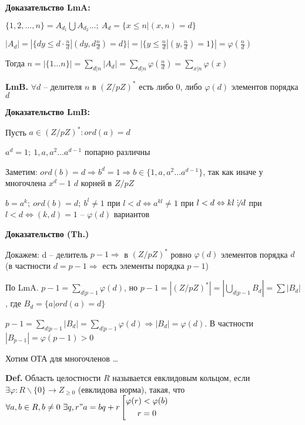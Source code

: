 \documentclass[14pt, letter paper]{article}
\def\divby{%
  \mathrel{\text{\vbox{\baselineskip.65ex\lineskiplimit0pt\hbox{.}\hbox{.}\hbox{.}}}}%
}
\begin{document}
\textbf{Доказательство LmA:}

$\{ 1, 2, \ldots, n\} = A_{d_1} \bigcup A_{d_2} \ldots;\ A_d = \{ x \leq n | (x, n) = d \}$

$|A_d| = |\{ dy \leq d \cdot \frac{n}{d} | (dy, d\frac{n}{d}) = d \}| = |\{y \leq \frac{n}{d} | (y, \frac{n}{d}) = 1\}| = \varphi(\frac{n}{d})$

Тогда $n = |\{1 \ldots n\}| = \sum\limits_{d | n} |A_d| = \sum\limits_{d | n} \varphi(\frac{n}{d}) = \sum\limits_{x | n} \varphi(x)$

\vspace{2mm}

\textbf{LmB.} $\forall d$ -- делителя $n$ в $(Z/pZ)^*$ есть либо 0, либо $\varphi(d)$ элементов порядка $d$

\textbf{Доказательство LmB:}

Пусть $a \in (Z/pZ)^* : ord(a) = d$

$a^d = 1;\ 1, a, a^2 \ldots a^{d-1}$ попарно различны

Заметим: $ord(b) = d \Rightarrow b^d = 1 \Rightarrow b \in \{1, a, a^2 \ldots a^{d-1}\}$, так как иначе у многочлена $x^d - 1$ $d$ корней в $Z/pZ$

$b = a^k;\ ord(b) = d;\ b^l \neq 1$ при $l < d \Leftrightarrow a^{kl} \neq 1$ при $l < d \Leftrightarrow kl \not \divby d$ при $l < d \Leftrightarrow (k, d) = 1$ -- $\varphi(d)$ вариантов

\vspace{2mm}

\begin{center}
    \textbf{Доказательство (Th.)}
\end{center}

Докажем: d -- делитель $p-1 \Rightarrow$ в $(Z/pZ)^*$ ровно $\varphi(d)$ элементов порядка $d$ (в частности $d = p - 1 \Rightarrow$ есть элементы порядка $p - 1$)

По LmA. $p-1 = \sum\limits_{d | p-1} \varphi(d)$, но $p - 1 = |(Z/pZ)^*| = |\bigcup\limits_{d | p-1} B_d| = \sum |B_d|$, где $B_d = \{a | ord(a) = d\}$

$p - 1 = \sum\limits_{d | p - 1} |B_d| = \sum\limits_{d | p - 1} \varphi(d) \Rightarrow |B_d| = \varphi(d)$. В частности $|B_{p-1}| = \varphi(p-1) > 0$

\vspace{5mm}

Хотим ОТА для многочленов \ldots

\textbf{Def.} Область целостности $R$ называется евклидовым кольцом, если $\exists \varphi : R\backslash\{0\} \rightarrow Z_{\geq 0}$ (евклидова норма), такая, что $\forall a, b \in R, b \neq 0\ \exists q, r " a = bq + r \left[ \begin{gathered}
    \varphi(r) < \varphi(b) \\
    r = 0
\end{gathered} \right.$
\end{document}
